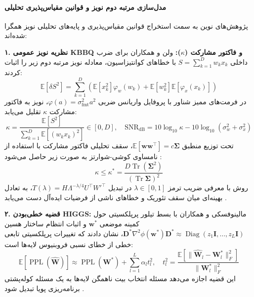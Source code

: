 \paragraph*{مدل‌سازی مرتبه دوم نویز و قوانین مقیاس‌پذیری تحلیلی}
پژوهش‌های نوین به سمت استخراج قوانین مقیاس‌پذیری و پایه‌های تحلیلی نویز همگرا شده‌اند:

\textbf{۱. نظریه نویز عمومی KBBQ و فاکتور مشارکت ($\kappa$):}
ولن و همکاران \cite{whalen2026kbbq} برای ضرب داخلی $S = \sum_{k=1}^D w_k x_k$ با خطاهای کوانتیزاسیون، معادله نویز مرتبه دوم زیر را اثبات کردند:
\begin{equation}
    \mathbb{E}[\delta S^2] = \sum_{k=1}^D \left( \mathbb{E}[x_k^2] \varphi_w(w_k) + \mathbb{E}[w_k^2] \mathbb{E}[\varphi_x(x_k)] \right)
\end{equation}
در فرمت‌های ممیز شناور با پروفایل واریانس ضربی $\varphi(a) = \sigma_{\text{fmt}}^2 a^2$، نویز به فاکتور مشارکت $\kappa$ تقلیل می‌یابد:
\begin{equation}
    \kappa = \frac{\mathbb{E}[S^2]}{\sum_{k=1}^D \mathbb{E}[(w_k x_k)^2]} \in [0, D], \quad \text{SNR}_{\text{dB}} = 10 \log_{10} \kappa - 10 \log_{10}(\sigma_w^2 + \sigma_x^2)
\end{equation}
تحت توزیع منطبق $\mathbb{E}[\mathbf{w}\mathbf{w}^\top] = c \boldsymbol{\Sigma}$، سقف تحلیلی فاکتور مشارکت با استفاده از نامساوی کوشی-شوارتز به صورت زیر حاصل می‌شود \cite{whalen2026kbbq}:
\begin{equation}
    \kappa \le \kappa^* = \frac{D \operatorname{Tr}(\boldsymbol{\Sigma}^2)}{(\operatorname{Tr} \boldsymbol{\Sigma})^2}
\end{equation}
روش  با معرفی ضریب ترمز $\lambda \in [0, 1]$ در تبدیل $T(\lambda) = H \Lambda^{-\lambda/4} U^\top W'^\top$، به تعادل بهینه‌ای میان سقف تئوریک و خطاهای ناشی از فرضیات ایده‌آل دست می‌یابد \cite{whalen2026kbbq}.

\textbf{۲. قضیه خطی‌بودن HIGGS:}
مالینوفسکی و همکاران \cite{malinovskii2024higgs} با بسط تیلور پرپلکسیتی حول کمینه موضعی $\mathbf{w}^*$ و اثبات انتظام ساختار هسین $\mathbf{D}^* \nabla^2 \phi(\mathbf{w}^*) \mathbf{D}^* \approx \operatorname{Diag}(z_1 \mathbf{I}, \dots, z_L \mathbf{I})$، نشان دادند که تغییرات پرپلکسیتی تابعی خطی از خطای نسبی فروبنیوس لایه‌ها است:
\begin{equation}
    \mathbb{E}[\operatorname{PPL}(\widehat{\mathbf{W}})] \approx \operatorname{PPL}(\mathbf{W}^*) + \sum_{l=1}^L \alpha_l t_l^2, \quad t_l^2 = \frac{\mathbb{E}[\|\widehat{\mathbf{W}}_l - \mathbf{W}_l^*\|_F^2]}{\|\mathbf{W}_l^*\|_F^2}
\end{equation}
این قضیه اجازه می‌دهد مسئله انتخاب بیت ناهمگن لایه‌ها به یک مسئله کوله‌پشتی برنامه‌ریزی پویا تبدیل شود \cite{malinovskii2024higgs}.

